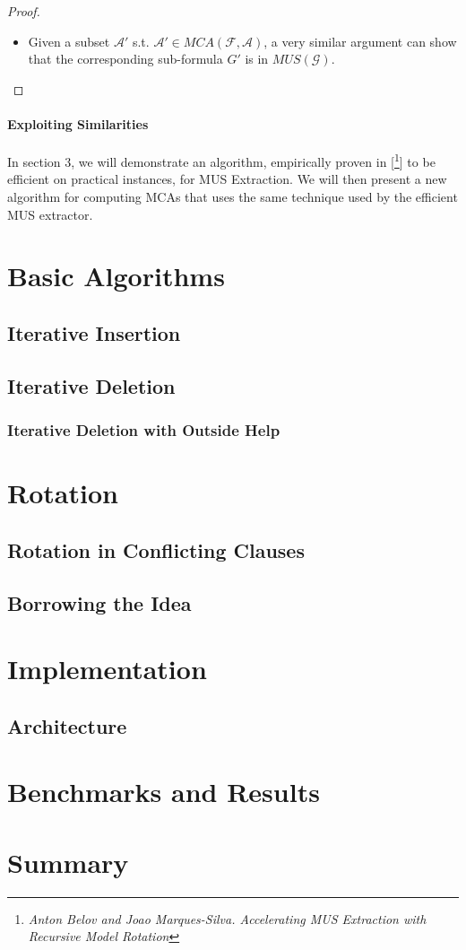 \documentclass[]{article}
\begin{document}
\begin{proof}
\begin{itemize}
		\item Given a subset $ \mathcal{A}'$ s.t. $ \mathcal{A}' \in MCA(\mathcal{F,A}) $, a very similar argument can show that the corresponding sub-formula $ {G}' $ is in $ MUS(\mathcal{G})$.
	\end{itemize}
	\end{proof}

\paragraph{Exploiting Similarities} In section 3, we will demonstrate an algorithm, empirically proven in [\footnote{\textit{Anton Belov and Joao Marques-Silva. Accelerating MUS Extraction with Recursive Model Rotation}}] to be efficient on practical instances, for MUS Extraction. We will then present a new algorithm for computing MCAs that uses the same technique used by the efficient MUS extractor.

	\section{Basic Algorithms}
	\subsection{Iterative Insertion}
	\subsection{Iterative Deletion}
	\subsubsection{Iterative Deletion with Outside Help}
	
	\section{Rotation}
	\subsection{Rotation in Conflicting Clauses}
	\subsection{Borrowing the Idea}
	
	\section{Implementation}
	\subsection{Architecture}
	
	\section{Benchmarks and Results}
	
	\section{Summary}
	
\end{document}

